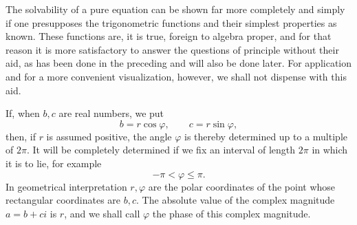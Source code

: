 \documentclass[11pt]{article}
\begin{document}
The solvability of a pure equation can be shown far more completely and simply if one presupposes the trigonometric functions and their simplest properties as known. These functions are, it is true, foreign to algebra proper, and for that reason it is more satisfactory to answer the questions of principle without their aid, as has been done in the preceding and will also be done later. For application and for a more convenient visualization, however, we shall not dispense with this aid.

If, when $b,c$ are real numbers, we put
\begin{equation}
 b=r\cos\varphi,
\qquad c=r\sin\varphi,
\tag{1}
\end{equation}
then, if $r$ is assumed positive, the angle $\varphi$ is thereby determined up to a multiple of $2\pi$. It will be completely determined if we fix an interval of length $2\pi$ in which it is to lie, for example
\[
 -\pi<\varphi\le \pi.
\]
In geometrical interpretation $r,\varphi$ are the polar coordinates of the point whose rectangular coordinates are $b,c$. The absolute value of the complex magnitude $a=b+ci$ is $r$, and we shall call $\varphi$ the phase of this complex magnitude.
\end{document}

